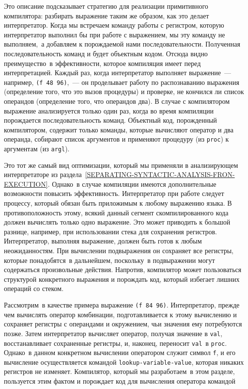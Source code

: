 Это описание подсказывает стратегию для реализации
примитивного компилятора: разбирать выражение таким же образом,
как это делает интерпретатор.  Когда мы встречаем команду работы с
регистром, которую интерпретатор выполнил бы при работе с выражением,
мы эту команду не выполняем,~а добавляем к порождаемой нами
последовательности.  Полученная последовательность команд и будет
объектным кодом.  Отсюда видно 
преимущество~в эффективности, которое
компиляция имеет перед интерпретацией.  Каждый раз, когда
интерпретатор выполняет выражение~--- например, {\tt (f 48
96)},~--- он проделывает работу по распознаванию выражения
(определение того, что это вызов процедуры) и проверке, не кончился
ли список операндов (определение того, что операндов два).  В случае с
компилятором выражение анализируется только один раз, когда во время
компиляции порождается последовательность команд.  Объектный код,
порожденный компилятором, содержит только команды, которые вычисляют
оператор и два операнда, собирают список аргументов и применяют
процедуру (из {\tt proc}) к аргументам (из
{\tt argl}).

Это тот же самый вид оптимизации, который мы применяли в
анализирующем интерпретаторе из 
раздела~\ref{SEPARATING-SYNTACTIC-ANALYSIS-FRON-EXECUTION}.
Однако~в случае компиляции имеются дополнительные возможности повысить
эффективность.  Интерпретатор при работе следует процессу,
который обязан быть приложимым к любому выражению языка.  В
противоположность этому, всякий данный сегмент скомпилированного кода
должен вычислять только одно выражение.  Это может приводить к большой
разнице, например, при использовании стека для сохранения регистров.
Интерпретатор, выполняя выражение, должен быть готов к любым
неожиданностям.  При вычислении подвыражения он сохраняет все
регистры, которые понадобятся~в дальнейшем, поскольку~в подвыражении
могут содержаться произвольные действия.  Напротив, компилятор
может пользоваться структурой конкретного выражения и порождать код,
который избегает лишних операций со стеком.

Рассмотрим~в качестве примера выражение {\tt (f 84
96)}.  Интерпретатор, прежде чем вычислять оператор комбинации,
подготавливается к этому вычислению и сохраняет регистры с
операндами и окружением, чьи значения ему потребуются позже.
Затем интерпретатор вычисляет оператор, получая значение в
{\tt val}, восстанавливает сохраненные регистры, и, наконец,
переносит {\tt val}~в {\tt proc}.  Однако~в данном
конкретном вычислении оператором служит символ
{\tt f}, и его вычисление осуществляется командой
{\tt lookup-variable-value}, которая никаких регистров не
изменяет.  Компилятор, который мы разработаем~в этом разделе,
пользуется этим фактом и порождает код для вычисления оператора
командой

